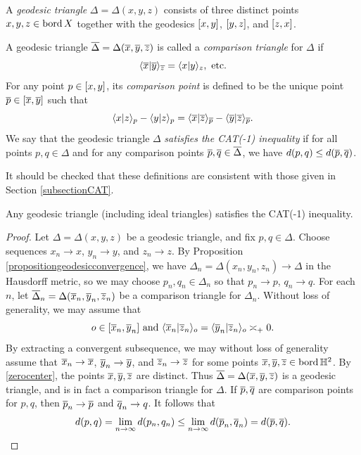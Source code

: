 \begin{definition}
\label{definitiontriangles}
A \emph{geodesic triangle} $\Delta = \Delta(x,y,z)$ consists of three distinct points $x,y,z\in\operatorname{bord} X$ together with the geodesics $[x,y]$, $[y,z]$, and $[z,x]$.

A geodesic triangle $\overline{\Delta} = \Delta(\overline x,\overline y,\overline z)$ is called a \emph{comparison triangle} for $\Delta$ if
\[
\langle \overline x|\overline y\rangle_{\overline z} = \langle x|y\rangle_z, \textup{ etc.}
\]
For any point $p\in[x,y]$, its \emph{comparison point} is defined to be the unique point $\overline p\in[\overline x,\overline y]$ such that
\[
\langle x|z\rangle_p - \langle y|z\rangle_p = \langle \overline x|\overline z\rangle_{\overline p} - \langle \overline y|\overline z\rangle_{\overline p}.
\]
We say that the geodesic triangle $\Delta$ \emph{satisfies the CAT(-1) inequality} if for all points $p,q\in\Delta$ and for any comparison points $\overline p,\overline q\in\overline\Delta$, we have $d(p,q) \leq d(\overline p,\overline q)$.
\end{definition}

It should be checked that these definitions are consistent with those given in Section \ref{subsectionCAT}.

\begin{proposition}
\label{propositionidealCAT}
Any geodesic triangle (including ideal triangles) satisfies the CAT(-1) inequality.
\end{proposition}
\begin{proof}
Let $\Delta = \Delta(x,y,z)$ be a geodesic triangle, and fix $p,q\in \Delta$. Choose sequences $x_n\to x$, $y_n\to y$, and $z_n\to z$. By Proposition \ref{propositiongeodesicconvergence}, we have $\Delta_n = \Delta(x_n,y_n,z_n) \to \Delta$ in the Hausdorff metric, so we may choose $p_n,q_n\in\Delta_n$ so that $p_n\to p$, $q_n\to q$. For each $n$, let $\overline\Delta_n = \Delta(\overline x_n,\overline y_n,\overline z_n)$ be a comparison triangle for $\Delta_n$. Without loss of generality, we may assume that
\begin{equation}
\label{zerocenter}
o\in[\overline x_n,\overline y_n] \textup{ and } \langle \overline x_n|\overline z_n \rangle_o = \langle \overline y_n | \overline z_n \rangle_o \asymp_+ 0.
\end{equation}
By extracting a convergent subsequence, we may without loss of generality assume that $\overline x_n\to \overline x$, $\overline y_n\to \overline y$, and $\overline z_n\to \overline z$ for some points $\wbar x,\wbar y,\wbar z\in\bord \H^2$. By \eqref{zerocenter}, the points $\overline x,\overline y,\overline z$ are distinct. Thus $\overline\Delta = \Delta(\overline x,\overline y,\overline z)$ is a geodesic triangle, and is in fact a comparison triangle for $\Delta$. If $\overline p,\overline q$ are comparison points for $p,q$, then $\overline p_n\to \overline p$ and $\overline q_n\to q$. It follows that
\[
d(p,q) = \lim_{n\to\infty} d(p_n,q_n) \leq \lim_{n\to\infty} d(\overline p_n,\overline q_n) = d(\overline p,\overline q).
\]
\end{proof}



